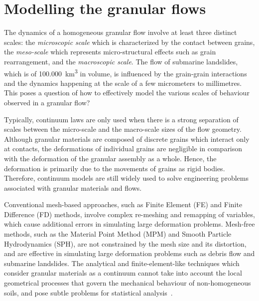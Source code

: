 \section{Modelling the granular flows}

The dynamics of a homogeneous granular flow involve at least three distinct 
scales: the \textit{microscopic scale} which is characterized by the contact 
between grains, the \textit{meso-scale} which represents micro-structural 
effects such as grain rearrangement, and the \textit{macroscopic scale}. The 
flow of submarine landslides, which is of \SI{100,000}{\km\cubed} in volume, is 
influenced by the grain-grain interactions and the dynamics happening at the 
scale of a few micrometers to millimetres. This poses a question of how to 
effectively model the various scales of behaviour observed in a granular 
flow?

Typically, continuum laws are only used when there is a strong separation of 
scales between the micro-scale and the macro-scale sizes of the flow geometry. 
Although granular materials are composed of discrete grains which interact only 
at contacts, the deformations of individual grains are negligible in comparison 
with the deformation of the granular assembly as a whole. Hence, the 
deformation is primarily due to the movements of grains as rigid bodies. 
Therefore, continuum models are still widely used to solve engineering problems 
associated with granular materials and flows. 

Conventional mesh-based approaches, such as Finite Element (FE) and Finite 
Difference (FD) methods, involve complex re-meshing and remapping of variables, 
which cause additional errors in simulating large deformation problems. 
Mesh-free methods, such as the Material Point Method (MPM) and Smooth Particle 
Hydrodynamics (SPH), are not constrained by the mesh size and its distortion, 
and are effective in simulating large deformation problems such as debris 
flow and submarine landslides. The analytical and finite-element-like 
techniques which consider granular materials as a continuum cannot take into 
account the local geometrical processes that govern the mechanical behaviour of 
non-homogeneous soils, and pose subtle problems for statistical 
analysis~\citep{Mehta1994}. 

